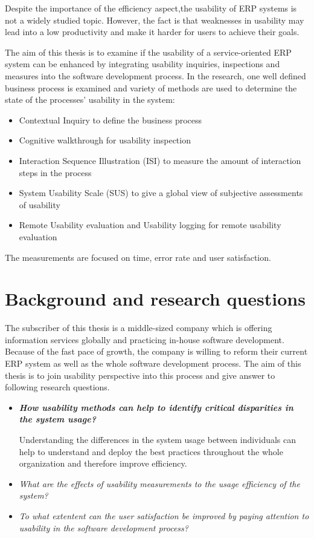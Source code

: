 \documentclass[12pt,a4paper,oneside,pdftex]{report}
\begin{document}
Despite the importance of the efficiency aspect,the usability of ERP systems is not a widely studied topic. However, the fact is that weaknesses in usability may lead into a low productivity and make it harder for users to achieve their goals.\cite{erpusability}

The aim of this thesis is to examine if the usability of a service-oriented ERP system can be enhanced by integrating usability inquiries, inspections and measures into the software development process. In the research, one well defined business process is examined and variety of methods are used to determine the state of the processes' usability in the system:
\begin{itemize}
\item Contextual Inquiry to define the business process
\item Cognitive walkthrough for usability inspection
\item Interaction Sequence Illustration (ISI) to measure the amount of interaction steps in the process
\item System Usability Scale (SUS) to give a global view of subjective assessments of usability
\item Remote Usability evaluation and Usability logging for remote usability evaluation
\end{itemize}
The measurements are focused on time, error rate and user satisfaction.

\section{Background and research questions}
\label{sec:background}
The subscriber of this thesis is a middle-sized company which is offering information services globally and practicing in-house software development. Because of the fast pace of growth, the company is willing to reform their current ERP system as well as the whole software development process. The aim of this thesis is to join usability perspective into this process and give answer to following research questions.

\begin{itemize}
\item \textbf{\emph{How usability methods can help to identify critical disparities in the system usage?}}

Understanding the differences in the system usage between individuals can help to understand and deploy the best practices throughout the whole organization and therefore improve efficiency.

\item \textit{What are the effects of usability measurements to the usage efficiency of the system?}
\item \textit{To what extentent can the user satisfaction be improved by paying attention to usability in the software development process?}
\end{itemize}
\end{document}
